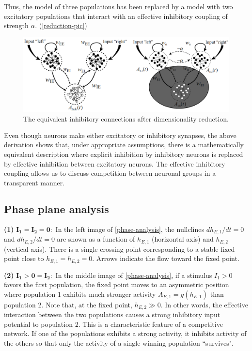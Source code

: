 \documentclass[12pt,hyperref,a4paper,UTF8]{ctexart}
\begin{document}
\noindent
Thus, the model of three populations has been replaced by a model with two excitatory populations that interact with an effective inhibitory coupling of strength $\alpha$. (\autoref{reduction-pic})

\begin{figure}[h]
    \begin{center}
    \includegraphics[width=\textwidth]{competition-pic.png}
    \caption{The equivalent inhibitory connections after dimensionality reduction.}
    \label{reduction-pic}
    \end{center}
\end{figure}

Even though neurons make either excitatory or inhibitory synapses, the above derivation shows that, under appropriate assumptions, there is a mathematically equivalent description where explicit inhibition by inhibitory neurons is replaced by effective inhibition between excitatory neurons. The effective inhibitory coupling allows us to discuss competition between neuronal groups in a transparent manner.

\subsection{Phase plane analysis}

\textbf{(1)} $\mathbf{I_1=I_2=0}:$ In the left image of \autoref{phase-analysis}, the nullclines $dh_{E,1}/dt = 0$ and $dh_{E,2}/dt = 0$ are shown as a function of $h_{E,1}$ (horizontal axis) and $h_{E,2}$ (vertical axis). There is a single crossing point corresponding to a stable fixed point close to $h_{E,1} = h_{E,2} = 0$. Arrows indicate the flow toward the fixed point.

\textbf{(2)} $\mathbf{I_1 > 0 = I_2}:$ In the middle image of \autoref{phase-analysis}, if a stimulus $I_1 > 0$ favors the first population, the fixed point moves to an asymmetric position where population 1 exhibits much stronger activity $A_{E,1} = g(h_{E,1})$ than population 2. Note that, at the fixed point, $h_{E,2}\gg 0$. In other words, the effective interaction between the two populations causes a strong inhibitory input potential to population 2. This is a characteristic feature of a competitive network. If one of the populations exhibits a strong activity, it inhibits activity of the others so that only the activity of a single winning population ``survives". 
\end{document}
